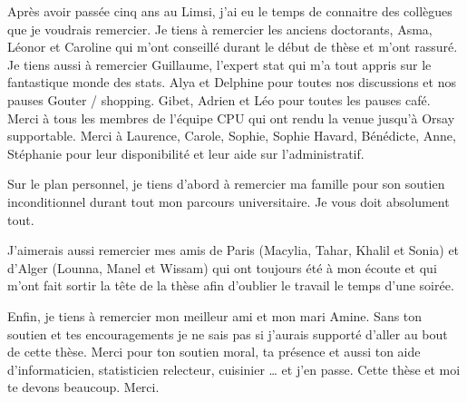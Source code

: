 Après avoir passée cinq ans au Limsi, j’ai eu le temps de connaitre des collègues que je voudrais remercier. Je tiens à remercier les anciens doctorants, Asma, Léonor et Caroline qui m’ont conseillé durant le début de thèse et m’ont rassuré.
Je tiens aussi à remercier Guillaume, l’expert stat qui m’a tout appris sur le fantastique monde des stats. Alya et Delphine pour toutes nos discussions et nos pauses Gouter / shopping. Gibet, Adrien et Léo pour toutes les pauses café.
Merci à tous les membres de l’équipe CPU qui ont rendu la venue jusqu’à Orsay supportable. 
Merci à Laurence, Carole, Sophie, Sophie Havard, Bénédicte, Anne, Stéphanie pour leur disponibilité et leur aide sur l’administratif.

Sur le plan personnel, je tiens d’abord à remercier ma famille pour son soutien inconditionnel durant tout mon parcours universitaire. Je vous doit absolument tout. 

J’aimerais aussi remercier mes amis de Paris (Macylia, Tahar, Khalil et Sonia) et d’Alger (Lounna, Manel et Wissam) qui ont toujours été à mon écoute et qui m’ont fait sortir la tête de la thèse afin d’oublier le travail le temps d’une soirée. 

Enfin, je tiens à remercier mon meilleur ami et mon mari Amine. Sans ton soutien et tes encouragements je ne sais pas si j’aurais supporté d’aller au bout de cette thèse. Merci pour ton soutien moral, ta présence et aussi ton aide d’informaticien, statisticien relecteur, cuisinier … et j’en passe.  Cette thèse et moi te devons beaucoup. Merci.